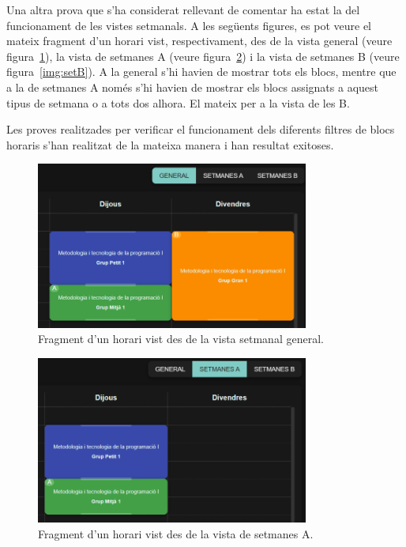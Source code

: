 \documentclass[a4paper,12pt]{ThesisStyle}
\begin{document}
Una altra prova que s'ha considerat rellevant de comentar ha estat la del funcionament de les vistes setmanals. A les següents figures, es pot veure el mateix fragment d'un horari vist, respectivament, des de la vista general (veure figura~\ref{img:setGeneral}), la vista de setmanes A (veure figura~\ref{img:setA}) i la vista de setmanes B (veure figura~\ref{img:setB}). A la general s'hi havien de mostrar tots els blocs, mentre que a la de setmanes A només s'hi havien de mostrar els blocs assignats a aquest tipus de setmana o a tots dos alhora. El mateix per a la vista de les B.

Les proves realitzades per verificar el funcionament dels diferents filtres de blocs horaris s'han realitzat de la mateixa manera i han resultat exitoses.

\newpage

\begin{figure}[H]
  \centering
  \includegraphics[width=0.8\textwidth]{assets/proves/setGeneral.png}
  \caption{\label{img:setGeneral} Fragment d'un horari vist des de la vista setmanal general.}
\end{figure}

\begin{figure}[H]
  \centering
  \includegraphics[width=0.8\textwidth]{assets/proves/setA.png}
  \caption{\label{img:setA} Fragment d'un horari vist des de la vista de setmanes A.}
\end{figure}
\end{document}
